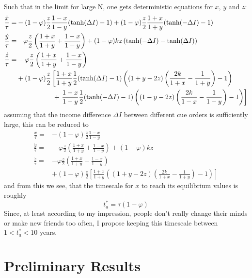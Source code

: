 Such that in the limit for large N, one gets deterministic equations for $x$, $y$ and $z$:
\begin{align}
	\frac{\dot{x}}{\tau} =& -(1-\varphi)\frac{z}{2}\frac{1-x}{1-y}({\rm tanh}(\Delta I)-1) + (1-\varphi)\frac{z}{2}\frac{1+x}{1+y}({\rm tanh}(-\Delta I)-1) \\
\frac{\dot{y}}{\tau} =& \quad \varphi\frac{z}{2}\left( \frac{1+x}{1+y} + \frac{1-x}{1-y} \right) + (1-\varphi)kz\left( {\rm tanh}(-\Delta I) - {\rm tanh}(\Delta I) \right) \\
	\frac{\dot{z}}{\tau} =& -\varphi\frac{z}{2}\left( \frac{1+x}{1+y} + \frac{1-x}{1-y} \right) \nonumber \\
	& + (1-\varphi)\frac{z}{2} \left[ \frac{1+x}{1+y} \frac{1}{2}({\rm tanh}(\Delta I)-1) \left( (1+y-2z)\left( \frac{2k}{1+x}-\frac{1}{1+y} \right)-1 \right) \right. \nonumber \\
	& \hspace{1.9 cm} + \left.\frac{1-x}{1-y}\frac{1}{2}({\rm tanh}(-\Delta I)-1)\left( (1-y-2z)\left( \frac{2k}{1-x}-\frac{1}{1-y} \right)-1 \right)  \right]
	\label{avm_ode}
\end{align}
assuming that the income difference $\Delta I$ between different cue orders is sufficiently large, this can be reduced to
\begin{align}
	\frac{\dot{x}}{\tau} =& -(1-\varphi)\frac{z}{2}\frac{1-x}{1-y} \\
\frac{\dot{y}}{\tau} =& \quad \varphi\frac{z}{2}\left( \frac{1+x}{1+y} + \frac{1-x}{1-y} \right) + (1-\varphi)kz \\
	\frac{\dot{z}}{\tau} =& -\varphi\frac{z}{2}\left( \frac{1+x}{1+y} + \frac{1-x}{1-y} \right) \nonumber \\
	& + (1-\varphi)\frac{z}{2} \left[ \frac{1+x}{1+y} \left( (1+y-2z)\left( \frac{2k}{1+x}-\frac{1}{1+y} \right)-1 \right) \right]
	\label{avm_ode_reduced}
\end{align}
and from this we see, that the timescale for $x$ to reach its equilibrium values is roughly 
\begin{equation}
	t_a^* = \tau(1-\varphi)
	\label{avm_timescale}
\end{equation}
Since, at least according to my impression, people don't really change their minds or make new friends too often, I propose keeping this timescale between $1<t_a^*<10$ years.

\section{Preliminary Results}  

